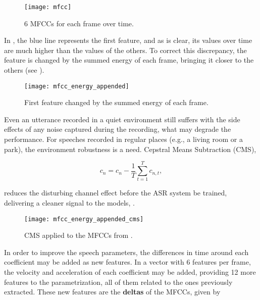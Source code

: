 \begin{figure}[ht]
    \centering
    \texttt{[image: mfcc]}
    \caption{6 MFCCs for each frame over time.}
    \label{fig:mfcc}
\end{figure}


In , the blue line represents the first feature, and as is clear, its values over time are much higher than the values of the others. To correct this discrepancy, the feature is changed by the summed energy of each frame, bringing it closer to the others (see ).

\begin{figure}[ht]
    \centering
    \texttt{[image: mfcc\_energy\_appended]}
    \caption{First feature changed by the summed energy of each frame.}
    \label{fig:mfcc_energy_appended}
\end{figure}


Even an utterance recorded in a quiet environment still suffers with the side effects of any noise captured during the recording, what may degrade the performance. For speeches recorded in regular places (e.g., a living room or a park), the environment robustness is a need. Cepstral Means Subtraction (CMS),

\begin{equation}
    c_n = c_n - \frac{1}{T} \sum_{t=1}^T c_{n,t},
    \label{eq:cms}
\end{equation}

\noindent reduces the disturbing channel effect before the ASR system be trained, delivering a cleaner signal to the models, .

\begin{figure}[ht]
    \centering
    \texttt{[image: mfcc\_energy\_appended\_cms]}
    \caption{CMS applied to the MFCCs from .}
    \label{fig:mfcc_energy_appended_cms}
\end{figure}


In order to improve the speech parameters, the differences in time around each coefficient may be added as new features. In a vector with 6 features per frame, the velocity and acceleration of each coefficient may be added, providing 12 more features to the parametrization, all of them related to the ones previously extracted. These new features are the \textbf{deltas} of the MFCCs, given by

